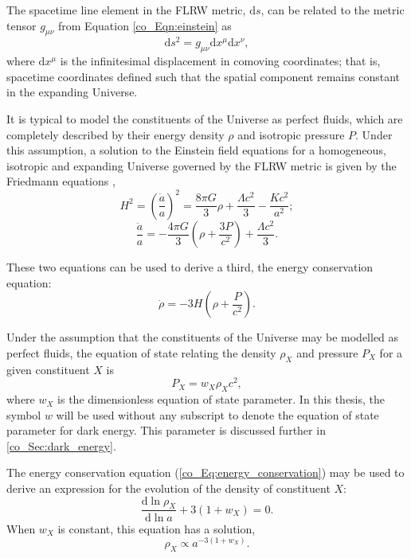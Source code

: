 The spacetime line element in the FLRW metric, $\text{d}s$, can be related to the metric tensor $g_{\mu \nu}$ from Equation \eqref{co_Eqn:einstein} as
\begin{equation}
\text{d}s^2 = g_{\mu \nu} \text{d}x^\mu \text{d}x^\nu,
\end{equation}
where $\text{d}x^\mu$ is the infinitesimal displacement in comoving coordinates; that is, spacetime coordinates defined such that the spatial component remains constant in the expanding Universe.

It is typical to model the constituents of the Universe as perfect fluids, which are completely described by their energy density $\rho$ and isotropic pressure $P$. Under this assumption, a solution to the Einstein field equations for a homogeneous, isotropic and expanding Universe governed by the FLRW metric is given by the Friedmann equations \citep{Friedmann1922, Friedmann1924},
\begin{equation}
H^2 = \left( \frac{\dot{a}}{a} \right)^2
= \frac{8 \pi G}{3} \rho
+ \frac{\Lambda c^2}{3}
- \frac{K c^2}{a^2};
\label{co_Eq:friedmann}
\end{equation}
\begin{equation}
\frac{\ddot{a}}{a} = - \frac{4 \pi G}{3}
\left( \rho + \frac{3 P}{c^2} \right) + \frac{\Lambda c^2}{3}.
\end{equation}

These two equations can be used to derive a third, the energy conservation equation:
\begin{equation}
\dot{\rho} = - 3 H \left( \rho + \frac{P}{c^2} \right).
\label{co_Eq:energy_conservation}
\end{equation}

Under the assumption that the constituents of the Universe may be modelled as perfect fluids, the equation of state relating the density $\rho_X$ and pressure $P_X$ for a given constituent $X$ is
\begin{equation}
P_X = w_X \rho_X c^2,
\end{equation}
where $w_X$ is the dimensionless equation of state parameter. In this thesis, the symbol $w$ will be used without any subscript to denote the equation of state parameter for dark energy. This parameter is discussed further in \autoref{co_Sec:dark_energy}.

The energy conservation equation (\autoref{co_Eq:energy_conservation}) may be used to derive an expression for the evolution of the density of constituent $X$:
\begin{equation}
\frac{\text{d} \ln{\rho_X}}{\text{d} \ln{a}} + 3 \left( 1 + w_X \right) = 0.
\end{equation}
When $w_X$ is constant, this equation has a solution,
\begin{equation}
\rho_X \propto a^{-3 \left( 1 + w_X \right)}.
\label{co_Eq:rho_dependence_on_a}
\end{equation}

